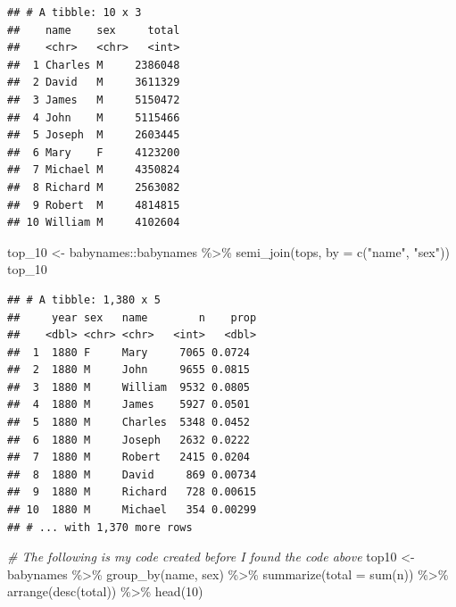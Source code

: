 \documentclass[
]{article}
\newenvironment{Shaded}{\begin{snugshade}}{\end{snugshade}}
\newcommand{\AttributeTok}[1]{\textcolor[rgb]{0.77,0.63,0.00}{#1}}
\newcommand{\CommentTok}[1]{\textcolor[rgb]{0.56,0.35,0.01}{\textit{#1}}}
\newcommand{\DecValTok}[1]{\textcolor[rgb]{0.00,0.00,0.81}{#1}}
\newcommand{\FunctionTok}[1]{\textcolor[rgb]{0.00,0.00,0.00}{#1}}
\newcommand{\NormalTok}[1]{#1}
\newcommand{\OtherTok}[1]{\textcolor[rgb]{0.56,0.35,0.01}{#1}}
\newcommand{\SpecialCharTok}[1]{\textcolor[rgb]{0.00,0.00,0.00}{#1}}
\newcommand{\StringTok}[1]{\textcolor[rgb]{0.31,0.60,0.02}{#1}}
\begin{document}
\begin{verbatim}
## # A tibble: 10 x 3
##    name    sex     total
##    <chr>   <chr>   <int>
##  1 Charles M     2386048
##  2 David   M     3611329
##  3 James   M     5150472
##  4 John    M     5115466
##  5 Joseph  M     2603445
##  6 Mary    F     4123200
##  7 Michael M     4350824
##  8 Richard M     2563082
##  9 Robert  M     4814815
## 10 William M     4102604
\end{verbatim}

\begin{Shaded}
\begin{Highlighting}[]
\NormalTok{top\_10 }\OtherTok{\textless{}{-}}\NormalTok{ babynames}\SpecialCharTok{::}\NormalTok{babynames }\SpecialCharTok{\%\textgreater{}\%} 
  \FunctionTok{semi\_join}\NormalTok{(tops, }\AttributeTok{by =} \FunctionTok{c}\NormalTok{(}\StringTok{"name"}\NormalTok{, }\StringTok{"sex"}\NormalTok{))}
\NormalTok{top\_10}
\end{Highlighting}
\end{Shaded}

\begin{verbatim}
## # A tibble: 1,380 x 5
##     year sex   name        n    prop
##    <dbl> <chr> <chr>   <int>   <dbl>
##  1  1880 F     Mary     7065 0.0724 
##  2  1880 M     John     9655 0.0815 
##  3  1880 M     William  9532 0.0805 
##  4  1880 M     James    5927 0.0501 
##  5  1880 M     Charles  5348 0.0452 
##  6  1880 M     Joseph   2632 0.0222 
##  7  1880 M     Robert   2415 0.0204 
##  8  1880 M     David     869 0.00734
##  9  1880 M     Richard   728 0.00615
## 10  1880 M     Michael   354 0.00299
## # ... with 1,370 more rows
\end{verbatim}

\begin{Shaded}
\begin{Highlighting}[]
\CommentTok{\# The following is my code created before I found the code above}
\NormalTok{top10 }\OtherTok{\textless{}{-}}\NormalTok{ babynames }\SpecialCharTok{\%\textgreater{}\%}
  \FunctionTok{group\_by}\NormalTok{(name, sex) }\SpecialCharTok{\%\textgreater{}\%}
  \FunctionTok{summarize}\NormalTok{(}\AttributeTok{total =} \FunctionTok{sum}\NormalTok{(n)) }\SpecialCharTok{\%\textgreater{}\%}
  \FunctionTok{arrange}\NormalTok{(}\FunctionTok{desc}\NormalTok{(total)) }\SpecialCharTok{\%\textgreater{}\%}
  \FunctionTok{head}\NormalTok{(}\DecValTok{10}\NormalTok{)}
\end{Highlighting}
\end{Shaded}
\end{document}
